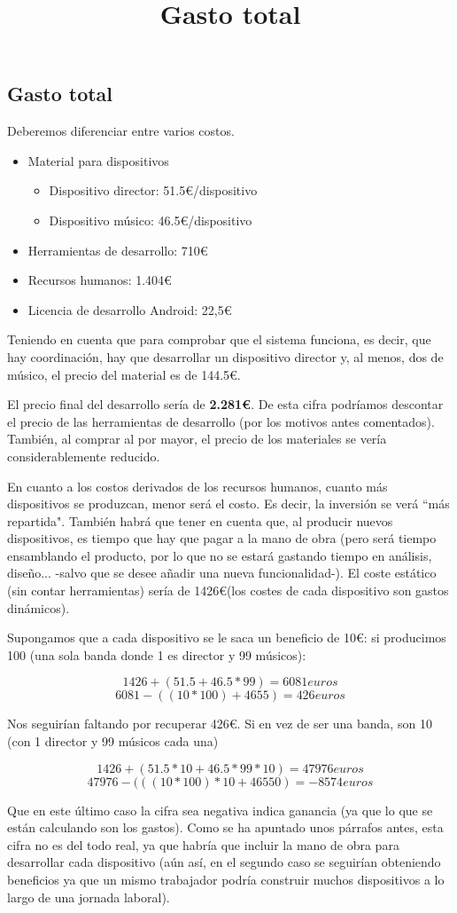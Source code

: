 \subsection{Gasto total}
\title{Gasto total}
Deberemos diferenciar entre varios costos.

  \begin{itemize}
    \item Material para dispositivos
      \begin{itemize}
        \item Dispositivo director: 51.5\euro/dispositivo
        \item Dispositivo músico: 46.5\euro/dispositivo
      \end{itemize}
    \item Herramientas de desarrollo: 710\euro
    \item Recursos humanos: 1.404\euro
    \item Licencia de desarrollo Android: 22,5\euro
  \end{itemize}

Teniendo en cuenta que para comprobar que el sistema funciona, es decir, que hay
coordinación, hay que desarrollar un dispositivo director y,  al menos, dos de músico,
el precio del material es de 144.5\euro.

El precio final del desarrollo sería de \textbf{2.281\euro}. De esta cifra podríamos
descontar el precio de las herramientas de desarrollo (por los motivos antes comentados).
También, al comprar al por mayor, el precio de los materiales se vería considerablemente
reducido.

En cuanto a los costos derivados de los recursos humanos, cuanto más dispositivos se produzcan,
menor será el costo. Es decir, la inversión se verá ``más repartida". También habrá que tener en
cuenta que, al producir nuevos dispositivos, es tiempo que hay que pagar a la mano de obra
(pero será tiempo ensamblando el producto, por lo que no se estará gastando tiempo en análisis,
diseño... -salvo que se desee añadir una nueva funcionalidad-). El coste estático (sin contar herramientas)
sería de 1426\euro (los costes de cada dispositivo son gastos dinámicos).

Supongamos que a cada dispositivo se le saca un beneficio de 10\euro: si producimos 100
(una sola banda donde 1 es director y 99 músicos):

\[
  1426 + (51.5+46.5*99) = 6081 euros
\]
\[
  6081 - ((10*100)+4655) = 426 euros
\]

Nos seguirían faltando por recuperar 426\euro. Si en vez de ser una banda, son 10 (con 1 director y 99 músicos cada una)


\[
  1426 + (51.5*10+46.5*99*10) = 47976 euros
\]
\[
  47976 - (((10*100)*10+46550) = -8574 euros
\]

Que en este último caso la cifra sea negativa indica ganancia (ya que lo que se están
calculando son los gastos). Como se ha apuntado unos párrafos antes, esta cifra no es
del todo real, ya que habría que incluir la mano de obra para desarrollar cada dispositivo
(aún así, en el segundo caso se seguirían obteniendo beneficios ya que un mismo trabajador
podría construir muchos dispositivos a lo largo de una jornada laboral).
